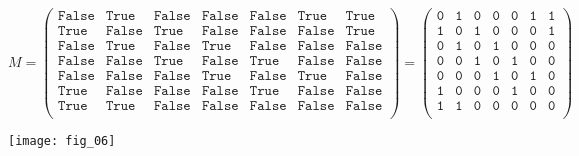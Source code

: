 \begin{exemple} 
\footnotesize{$
M =
\begin{pmatrix}
\texttt{False} & \texttt{True} & \texttt{False} & \texttt{False} & \texttt{False} & \texttt{True} & \texttt{True} \\
\texttt{True} & \texttt{False} & \texttt{True} & \texttt{False} & \texttt{False} & \texttt{False} & \texttt{True} \\ 
\texttt{False} & \texttt{True} & \texttt{False} & \texttt{True} & \texttt{False} & \texttt{False} & \texttt{False} \\
\texttt{False} & \texttt{False} & \texttt{True} & \texttt{False} & \texttt{True} & \texttt{False} & \texttt{False} \\
\texttt{False} & \texttt{False} & \texttt{False} & \texttt{True} & \texttt{False} & \texttt{True} & \texttt{False} \\
\texttt{True} & \texttt{False} & \texttt{False} & \texttt{False} & \texttt{True} & \texttt{False} & \texttt{False} \\
\texttt{True} & \texttt{True} & \texttt{False} & \texttt{False} & \texttt{False} & \texttt{False} & \texttt{False} \\
\end{pmatrix}
=
\begin{pmatrix}
\texttt{0} & \texttt{1} & \texttt{0} & \texttt{0} & \texttt{0} & \texttt{1} & \texttt{1} \\
\texttt{1} & \texttt{0} & \texttt{1} & \texttt{0} & \texttt{0} & \texttt{0} & \texttt{1} \\ 
\texttt{0} & \texttt{1} & \texttt{0} & \texttt{1} & \texttt{0} & \texttt{0} & \texttt{0} \\
\texttt{0} & \texttt{0} & \texttt{1} & \texttt{0} & \texttt{1} & \texttt{0} & \texttt{0} \\
\texttt{0} & \texttt{0} & \texttt{0} & \texttt{1} & \texttt{0} & \texttt{1} & \texttt{0} \\
\texttt{1} & \texttt{0} & \texttt{0} & \texttt{0} & \texttt{1} & \texttt{0} & \texttt{0} \\
\texttt{1} & \texttt{1} & \texttt{0} & \texttt{0} & \texttt{0} & \texttt{0} & \texttt{0} \\
\end{pmatrix}$}
\end{exemple}


\begin{marginfigure}
\texttt{[image: fig\_06]}
\end{marginfigure}


